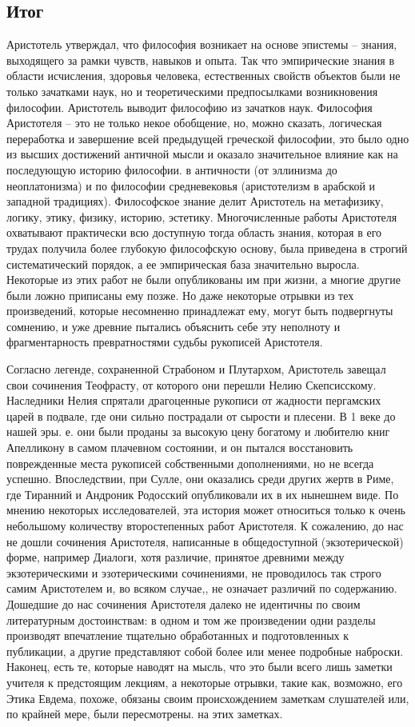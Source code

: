 \documentclass[a4paper, 14pt]{extreport}
\begin{document}
\subsection{Итог}

Аристотель утверждал, что философия возникает на основе эпистемы --
знания, выходящего за рамки чувств, навыков и опыта. Так что
эмпирические знания в области исчисления, здоровья человека,
естественных свойств объектов были не только зачатками наук, но и
теоретическими предпосылками возникновения философии. Аристотель выводит
философию из зачатков наук. Философия Аристотеля -- это не только некое
обобщение, но, можно сказать, логическая переработка и завершение всей
предыдущей греческой философии, это было одно из высших достижений
античной мысли и оказало значительное влияние как на последующую историю
философии. в античности (от эллинизма до неоплатонизма) и по философии
средневековья (аристотелизм в арабской и западной традициях).
Философское знание делит Аристотель на метафизику, логику, этику,
физику, историю, эстетику. Многочисленные работы Аристотеля охватывают
практически всю доступную тогда область знания, которая в его трудах
получила более глубокую философскую основу, была приведена в строгий
систематический порядок, а ее эмпирическая база значительно выросла.
Некоторые из этих работ не были опубликованы им при жизни, а многие
другие были ложно приписаны ему позже. Но даже некоторые отрывки из тех
произведений, которые несомненно принадлежат ему, могут быть подвергнуты
сомнению, и уже древние пытались объяснить себе эту неполноту и
фрагментарность превратностями судьбы рукописей Аристотеля.

Согласно легенде, сохраненной Страбоном и Плутархом, Аристотель завещал
свои сочинения Теофрасту, от которого они перешли Нелию Скепсисскому.
Наследники Нелия спрятали драгоценные рукописи от жадности пергамских
царей в подвале, где они сильно пострадали от сырости и плесени. В 1
веке до нашей эры. е. они были проданы за высокую цену богатому и
любителю книг Апелликону в самом плачевном состоянии, и он пытался
восстановить поврежденные места рукописей собственными дополнениями, но
не всегда успешно. Впоследствии, при Сулле, они оказались среди других
жертв в Риме, где Тиранний и Андроник Родосский опубликовали их в их
нынешнем виде. По мнению некоторых исследователей, эта история может
относиться только к очень небольшому количеству второстепенных работ
Аристотеля. К сожалению, до нас не дошли сочинения Аристотеля,
написанные в общедоступной (экзотерической) форме, например Диалоги,
хотя различие, принятое древними между экзотерическими и эзотерическими
сочинениями, не проводилось так строго самим Аристотелем и, во всяком
случае,, не означает различий по содержанию. Дошедшие до нас сочинения
Аристотеля далеко не идентичны по своим литературным достоинствам: в
одном и том же произведении одни разделы производят впечатление
тщательно обработанных и подготовленных к публикации, а другие
представляют собой более или менее подробные наброски. Наконец, есть те,
которые наводят на мысль, что это были всего лишь заметки учителя к
предстоящим лекциям, а некоторые отрывки, такие как, возможно, его Этика
Евдема, похоже, обязаны своим происхождением заметкам слушателей или, по
крайней мере, были пересмотрены. на этих заметках.
\end{document}
